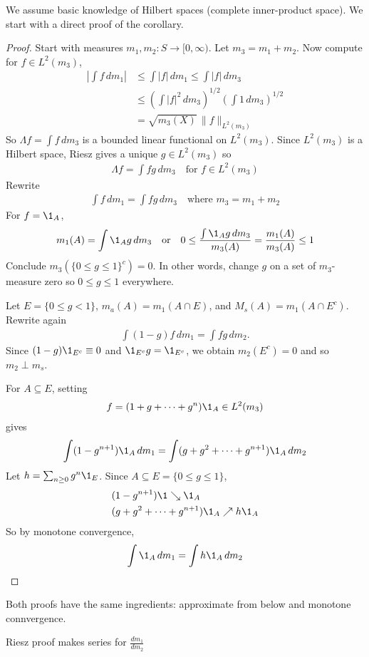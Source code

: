 We assume basic knowledge of Hilbert spaces (complete inner-product space).
We start with a direct proof of the corollary.

\begin{proof}
	Start with measures $m_1, m_2 :S \to [0,\infty)$.
	Let  $m_3 = m_1 + m_2$. Now compute for $f \in L^2 (m_3)$,
	\begin{align*}
		\left| \int f \, dm_1 \right| &\leq \int |f| \, dm_1 \leq \int |f| \, dm_3 \\
						&\leq \left( \int |f|^2 \, dm_3 \right)^{1/2} \left( \int 1 \, dm_3 \right)^{1/2}\\
						&= \sqrt{m_3 (X)} \, \|f\|_{L^{2}(m_3)}
	\end{align*}
	So $\Lambda f = \int f \, dm_3$ is a bounded linear functional on $L^2(m_3)$.
	Since $L^{2} (m_3)$ is a Hilbert space, Riesz gives a unique $g \in L^{2} (m_3)$ so
	\begin{align*}
		\Lambda f = \int f g \, dm_3 \quad \text{for } f \in L^{2}(m_3)
	\end{align*}
	Rewrite
	\begin{align*}
		\int f \, dm_1 = \int f g \, dm_3 \quad \text{where $m_3 = m_1 + m_2$}
	\end{align*}
	For $f = \1_{A}$,
	\begin{align*}
		m_1 (A) = \int \1_{A} g \, dm_3 
		\quad \text{or} \quad 0 \leq \frac{\int \1_{A} g \, dm_3}{m_3 (A)} = \frac{ m_1 (A)}{m_3 (A)} \leq 1
	\end{align*}
	Conclude $m_3 (\{0 \leq g \leq 1\}^c) = 0$. In other words, change $g$ on a set of $m_3$-measure zero so $0 \leq g \leq 1$ everywhere.
	
	Let $E = \{ 0 \leq g < 1 \}$, $m_a (A) = m_1 (A \cap E)$, and
	$M_s (A) = m_1 (A \cap E^c)$.
	Rewrite again
	\begin{align*}
		\int (1 - g) f \, dm_1 = \int fg \,dm_2.
	\end{align*}
	Since $(1 - g) \1_{E^c} \equiv 0$ and $\1_{E^c} g = \1_{E^c}$, we obtain $m_2 (E^c) = 0$
	and so $m_2 \perp m_s$.

	For $A \subseteq E$, setting
	\begin{align*}
		f = (1 + g + \cdots + g^n) \1_{A } \in L^2 (m_3)
	\end{align*} gives
	\begin{align*}
		\int ( 1 - g^{n+1}) \1_{A} \, dm_1 = \int (g + g^2 + \cdots + g^{n+1}) \1_{A} \, dm_2
	\end{align*}
	Let $h = \sum_{n \geq 0} g^{n} \1_{E}$. Since $A \subseteq E = \{ 0 \leq g \leq 1\}$,
	\begin{align*}
		&(1 - g^{n+1}) \1 \searrow \1_{A} \\
		&(g + g^2 + \cdots + g^{n+1} ) \1_{A} \nearrow h \1_{A}
	\end{align*}
	So by monotone convergence,
	\begin{align*}
		\int \1_{A} \, dm_1 = \int h \1_{A} \, dm_2
	\end{align*}
\end{proof}

\begin{remark}
	Both proofs have the same ingredients: approximate from below and monotone connvergence.

	Riesz proof makes series for $\frac{d m_1}{d m_2}$
\end{remark}

